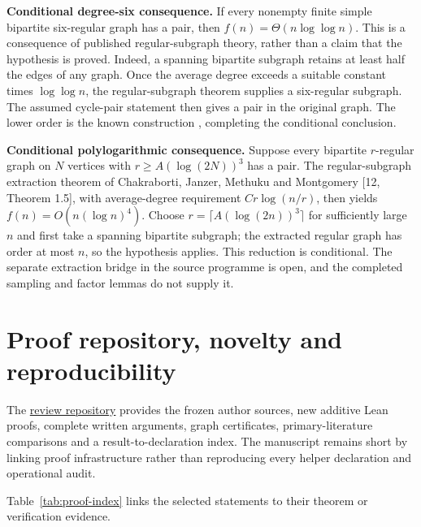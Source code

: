 \documentclass[smallextended]{svjour3}
\newcounter{none} %
\begin{document}
\textbf{Conditional degree-six consequence.} If every nonempty finite
simple bipartite six-regular graph has a pair, then
\(f(n)=\Theta(n\log\log n)\). This is a consequence of published
regular-subgraph theory, rather than a claim that the hypothesis is
proved. Indeed, a spanning bipartite subgraph retains at least half the
edges of any graph. Once the average degree exceeds a suitable constant
times \(\log\log n\), the regular-subgraph theorem \cite{ref4} supplies a
six-regular subgraph. The assumed cycle-pair statement then gives a pair
in the original graph. The lower order is the known construction
\cite{ref3}, completing the conditional conclusion.

\textbf{Conditional polylogarithmic consequence.} Suppose every
bipartite \(r\)-regular graph on \(N\) vertices with
\(r\ge A(\log(2N))^3\) has a pair. The regular-subgraph extraction
theorem of Chakraborti, Janzer, Methuku and Montgomery {[}12, Theorem
1.5{]}, with average-degree requirement \(Cr\log(n/r)\), then yields
\(f(n)=O(n(\log n)^4)\). Choose \(r=\lceil A(\log(2n))^3\rceil\) for
sufficiently large \(n\) and first take a spanning bipartite subgraph;
the extracted regular graph has order at most \(n\), so the hypothesis
applies. This reduction is conditional. The separate extraction bridge
in the source programme is open, and the completed sampling and factor
lemmas do not supply it.

\section{Proof repository, novelty and
reproducibility}\label{proof-repository-novelty-and-reproducibility}

The
\href{https://github.com/alejandrozu/openmath-2026-judging/tree/70c5ec3107658182f22c207d4c50f53f9cb3e602/robert-review-2026-10-07}{review
repository} provides the frozen author sources, new additive Lean
proofs, complete written arguments, graph certificates,
primary-literature comparisons and a result-to-declaration index. The
manuscript remains short by linking proof infrastructure rather than
reproducing every helper declaration and operational audit.

Table~\ref{tab:proof-index} links the selected statements to their theorem or verification evidence.
\end{document}
